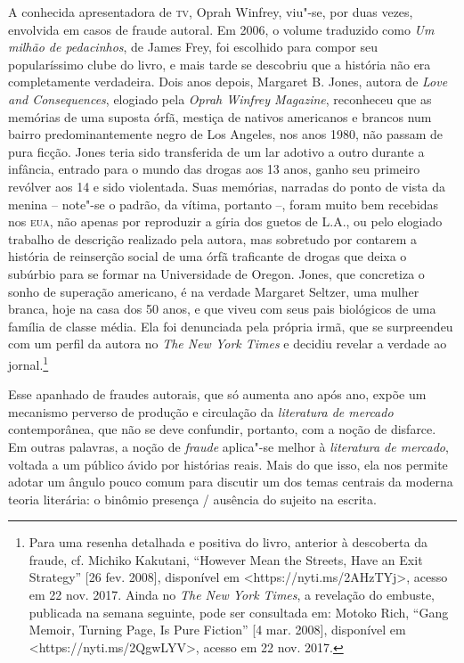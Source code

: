 A conhecida apresentadora de \textsc{tv}, Oprah Winfrey, viu"-se, por
duas vezes, envolvida em casos de fraude autoral. Em 2006, o volume
traduzido como \emph{Um milhão de pedacinhos}, de James Frey, foi
escolhido para compor seu popularíssimo clube do livro, e mais tarde se
descobriu que a história não era completamente verdadeira. Dois anos
depois, Margaret B. Jones, autora de \emph{Love and Consequences},
elogiado pela \emph{Oprah Winfrey Magazine}, reconheceu que as memórias
de uma suposta órfã, mestiça de nativos americanos e brancos num bairro
predominantemente negro de Los Angeles, nos anos 1980, não passam de
pura ficção. Jones teria sido transferida de um lar adotivo a outro
durante a infância, entrado para o mundo das drogas aos 13 anos, ganho
seu primeiro revólver aos 14 e sido violentada. Suas memórias, narradas
do ponto de vista da menina -- note"-se o padrão, da vítima, portanto --,
foram muito bem recebidas nos \textsc{eua}, não apenas por reproduzir a
gíria dos guetos de L.A., ou pelo elogiado trabalho de descrição
realizado pela autora, mas sobretudo por contarem a história de
reinserção social de uma órfã traficante de drogas que deixa o subúrbio
para se formar na Universidade de Oregon. Jones, que concretiza o sonho
de superação americano, é na verdade Margaret Seltzer, uma mulher
branca, hoje na casa dos 50 anos, e que viveu com seus pais biológicos
de uma família de classe média. Ela foi denunciada pela própria irmã,
que se surpreendeu com um perfil da autora no \emph{The New York Times}
e decidiu revelar a verdade ao jornal.\footnote{Para uma resenha
  detalhada e positiva do livro, anterior à descoberta da fraude, cf.
  Michiko Kakutani, ``However Mean the Streets, Have an Exit Strategy''
  {[}26 fev. 2008{]}, disponível em
  \textless{}https://nyti.ms/2AHzTYj\textgreater{},
  acesso em 22 nov. 2017. Ainda no \emph{The New York Times}, a
  revelação do embuste, publicada na semana seguinte, pode ser
  consultada em: Motoko Rich, ``Gang Memoir, Turning Page, Is Pure
  Fiction'' {[}4 mar. 2008{]}, disponível em
  \textless{}https://nyti.ms/2QgwLYV\textgreater{},
  acesso em 22 nov. 2017.}

Esse apanhado de fraudes autorais, que só aumenta ano após
ano, expõe um mecanismo perverso de produção e circulação da
\emph{literatura de mercado} contemporânea, que não se deve confundir,
portanto, com a noção de disfarce. Em outras palavras, a noção de
\emph{fraude} aplica"-se melhor à \emph{literatura de mercado}, voltada a
um público ávido por histórias reais. Mais do que isso, ela nos permite
adotar um ângulo pouco comum para discutir um dos temas centrais da
moderna teoria literária: o binômio presença / ausência do sujeito na
escrita.

